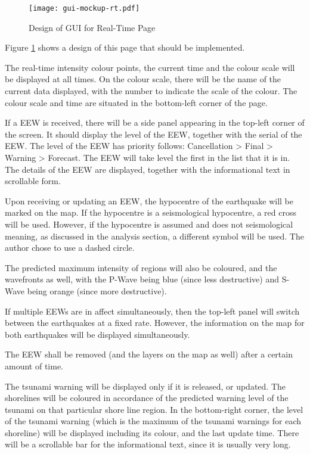 \begin{figure}[htp]
    \centering
    \texttt{[image: gui-mockup-rt.pdf]}
    \caption{Design of GUI for Real-Time Page}
    \label{fig:gui-mockup-rt}
\end{figure}

Figure \ref{fig:gui-mockup-rt} shows a design of this page that should be implemented.

The real-time intensity colour points, the current time and the colour scale will be displayed at all times. On the colour scale, there will be the name of the current data displayed, with the number to indicate the scale of the colour. The colour scale and time are situated in the bottom-left corner of the page.

If a EEW is received, there will be a side panel appearing in the top-left corner of the screen. It should display the level of the EEW, together with the serial of the EEW. The level of the EEW has priority follows: Cancellation > Final > Warning > Forecast. The EEW will take level the first in the list that it is in. The details of the EEW are displayed, together with the informational text in scrollable form.

Upon receiving or updating an EEW, the hypocentre of the earthquake will be marked on the map. If the hypocentre is a seismological hypocentre, a red cross will be used. However, if the hypocentre is assumed and does not seismological meaning, as discussed in the analysis section, a different symbol will be used. The author chose to use a dashed circle.

The predicted maximum intensity of regions will also be coloured, and the wavefronts as well, with the P-Wave being blue (since less destructive) and S-Wave being orange (since more destructive).

If multiple EEWs are in affect simultaneously, then the top-left panel will switch between the earthquakes at a fixed rate. However, the information on the map for both earthquakes will be displayed simultaneously.

The EEW shall be removed (and the layers on the map as well) after a certain amount of time.

The tsunami warning will be displayed only if it is released, or updated. The shorelines will be coloured in accordance of the predicted warning level of the tsunami on that particular shore line region. In the bottom-right corner, the level of the tsunami warning (which is the maximum of the tsunami warnings for each shoreline) will be displayed including its colour, and the last update time. There will be a scrollable bar for the informational text, since it is usually very long.


